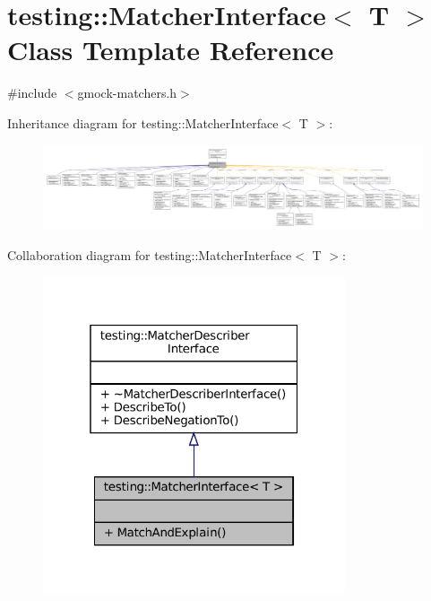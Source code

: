 \hypertarget{classtesting_1_1MatcherInterface}{}\section{testing\+:\+:Matcher\+Interface$<$ T $>$ Class Template Reference}
\label{classtesting_1_1MatcherInterface}


{\ttfamily \#include $<$gmock-\/matchers.\+h$>$}



Inheritance diagram for testing\+:\+:Matcher\+Interface$<$ T $>$\+:
\nopagebreak
\begin{figure}[H]
\begin{center}
\leavevmode
\includegraphics[width=350pt]{classtesting_1_1MatcherInterface__inherit__graph}
\end{center}
\end{figure}


Collaboration diagram for testing\+:\+:Matcher\+Interface$<$ T $>$\+:
\nopagebreak
\begin{figure}[H]
\begin{center}
\leavevmode
\includegraphics[width=253pt]{classtesting_1_1MatcherInterface__coll__graph}
\end{center}
\end{figure}
